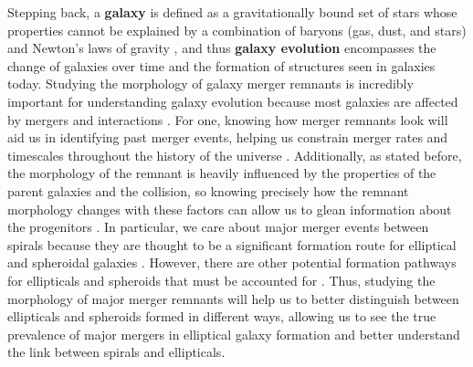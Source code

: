 \documentclass[twocolumn]{aastex631}
\begin{document}
Stepping back, a \textbf{galaxy} is defined as a gravitationally bound set of stars whose properties cannot be explained by a combination of baryons (gas, dust, and stars) and Newton's laws of gravity \citep{Willman+2012}, and thus \textbf{galaxy evolution} encompasses the change of galaxies over time and the formation of structures seen in galaxies today.
Studying the morphology of galaxy merger remnants is incredibly important for understanding galaxy evolution because most galaxies are affected by mergers and interactions \citep{Barnes+1992}.
For one, knowing how merger remnants look will aid us in identifying past merger events, helping us constrain merger rates and timescales throughout the history of the universe \citep{Lotz+2008}. 
Additionally, as stated before, the morphology of the remnant is heavily influenced by the properties of the parent galaxies and the collision, so knowing precisely how the remnant morphology changes with these factors can allow us to glean information about the progenitors \citep{Barnes+1992}.
In particular, we care about major merger events between spirals because they are thought to be a significant formation route for elliptical and spheroidal galaxies \citep{Barnes+1992}. 
However, there are other potential formation pathways for ellipticals and spheroids that must be accounted for \citep{Lotz+2008}.
Thus, studying the morphology of major merger remnants will help us to better distinguish between ellipticals and spheroids formed in different ways, allowing us to see the true prevalence of major mergers in elliptical galaxy formation and better understand the link between spirals and ellipticals.
\end{document}
